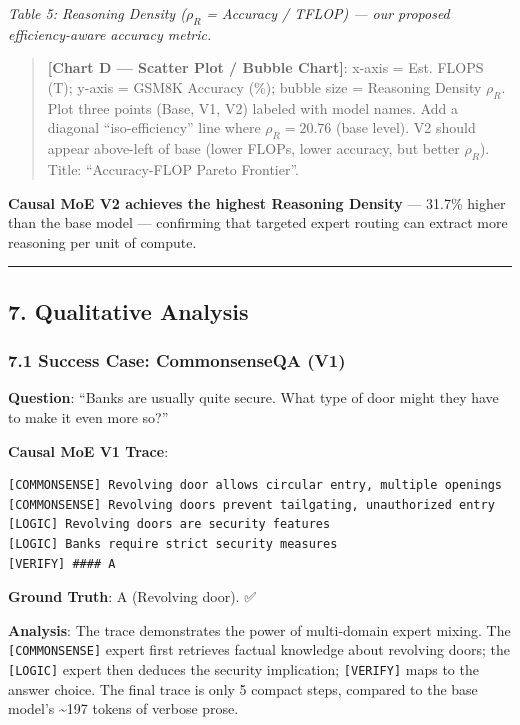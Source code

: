 \emph{Table 5: Reasoning Density (\(\rho_R\) = Accuracy / TFLOP) --- our
proposed efficiency-aware accuracy metric.}

\begin{quote}
\textbf{{[}Chart D --- Scatter Plot / Bubble Chart{]}}: x-axis = Est.
FLOPS (T); y-axis = GSM8K Accuracy (\%); bubble size = Reasoning Density
\(\rho_R\). Plot three points (Base, V1, V2) labeled with model names.
Add a diagonal ``iso-efficiency'' line where \(\rho_R = 20.76\) (base
level). V2 should appear above-left of base (lower FLOPs, lower
accuracy, but better \(\rho_R\)). Title: ``Accuracy-FLOP Pareto
Frontier''.
\end{quote}

\textbf{Causal MoE V2 achieves the highest Reasoning Density} --- 31.7\%
higher than the base model --- confirming that targeted expert routing
can extract more reasoning per unit of compute.

\begin{center}\rule{0.5\linewidth}{0.5pt}\end{center}

\subsection{7. Qualitative Analysis}\label{qualitative-analysis}

\subsubsection{7.1 Success Case: CommonsenseQA
(V1)}\label{success-case-commonsenseqa-v1}

\textbf{Question}: ``Banks are usually quite secure. What type of door
might they have to make it even more so?''

\textbf{Causal MoE V1 Trace}:

\begin{verbatim}
[COMMONSENSE] Revolving door allows circular entry, multiple openings
[COMMONSENSE] Revolving doors prevent tailgating, unauthorized entry
[LOGIC] Revolving doors are security features
[LOGIC] Banks require strict security measures
[VERIFY] #### A
\end{verbatim}

\textbf{Ground Truth}: A (Revolving door). ✅

\textbf{Analysis}: The trace demonstrates the power of multi-domain
expert mixing. The \texttt{{[}COMMONSENSE{]}} expert first retrieves
factual knowledge about revolving doors; the \texttt{{[}LOGIC{]}} expert
then deduces the security implication; \texttt{{[}VERIFY{]}} maps to the
answer choice. The final trace is only 5 compact steps, compared to the
base model's \textasciitilde197 tokens of verbose prose.

